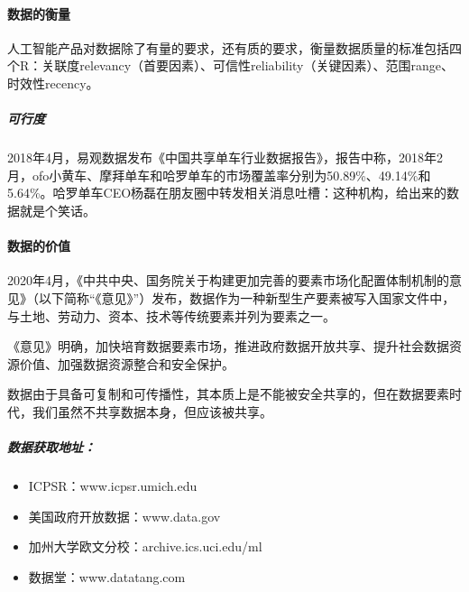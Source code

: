 \documentclass[letterpaper,10pt,english]{sphinxmanual}
\begin{document}
\paragraph{数据的衡量}
\label{\detokenize{chapter_data_dive/data:id3}}
人工智能产品对数据除了有量的要求，还有质的要求，衡量数据质量的标准包括四个R：关联度relevancy（首要因素）、可信性reliability（关键因素）、范围range、时效性recency。


\subparagraph{可行度}
\label{\detokenize{chapter_data_dive/data:id4}}
2018年4月，易观数据发布《中国共享单车行业数据报告》，报告中称，2018年2月，ofo小黄车、摩拜单车和哈罗单车的市场覆盖率分别为50.89\%、49.14\%和5.64\%。哈罗单车CEO杨磊在朋友圈中转发相关消息吐槽：这种机构，给出来的数据就是个笑话。%
\begin{footnote}[904]\sphinxAtStartFootnote
{}
%
\end{footnote}


\paragraph{数据的价值}
\label{\detokenize{chapter_data_dive/data:id5}}
2020年4月，《中共中央、国务院关于构建更加完善的要素市场化配置体制机制的意见》（以下简称“《意见》”）发布，数据作为一种新型生产要素被写入国家文件中，与土地、劳动力、资本、技术等传统要素并列为要素之一。

《意见》明确，加快培育数据要素市场，推进政府数据开放共享、提升社会数据资源价值、加强数据资源整合和安全保护。%
\begin{footnote}[905]\sphinxAtStartFootnote
{}
%
\end{footnote}

数据由于具备可复制和可传播性，其本质上是不能被安全共享的，但在数据要素时代，我们虽然不共享数据本身，但应该被共享。%
\begin{footnote}[906]\sphinxAtStartFootnote
{}
%
\end{footnote}


\subparagraph{数据获取地址：}
\label{\detokenize{chapter_data_dive/data:id6}}\begin{itemize}
\item {} 
ICPSR：www.icpsr.umich.edu

\item {} 
美国政府开放数据：www.data.gov

\item {} 
加州大学欧文分校：archive.ics.uci.edu/ml

\item {} 
数据堂：www.datatang.com

\end{itemize}
\end{document}
